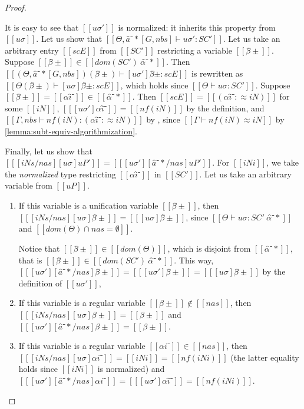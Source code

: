 \begin{proof}
\begin{caseof}
        It is easy to see that $[[uσ']]$ is normalized: it inherits this property from 
        $[[uσ]]$.
        Let us show that $[[Θ, â⁻*[G, nbs] ⊢ uσ' : SC']] $.
        Let us take an arbitrary entry $[[scE]]$ from $[[SC']]$ restricting a variable $[[β̂±]]$.
        Suppose $[[β̂±]] \in [[dom(SC') \ {α̂⁻*}]]$. Then
        $[[ (Θ, â⁻*[G, nbs])(β̂±) ⊢ [uσ']β̂± : scE ]]$ is
        rewritten as $[[ Θ(β̂±) ⊢ [uσ]β̂± : scE ]]$, which holds since $[[ Θ   ⊢ uσ : SC' ]]$.
        Suppose $[[β̂±]] = [[αî⁻]] \in [[α̂⁻*]]$. Then
        $[[scE]] = [[(αî⁻ :≈ iN)]]$ for some $[[iN]]$, 
        $[[ [uσ']αî⁻ ]] = [[ nf(iN) ]]$ by the definition,
        and $[[ Γ, nbs ⊢ nf(iN) : (αî⁻ :≈ iN) ]]$ by ,
        since $[[Γ ⊢ nf(iN) ≈ iN]]$ by \cref{lemma:subt-equiv-algorithmization}.

        Finally, let us show that $[[ [iNs/nas][uσ]uP' ]] = [[ [uσ'][â⁻*/nas]uP' ]]$.
        For $[[iNi]]$, we take the \emph{normalized} type restricting $[[αî⁻]]$ in $[[SC']]$.
        Let us take an arbitrary variable from $[[uP]]$.
        \begin{enumerate}
            \item If this variable is a unification variable $[[β̂±]]$, then
                $[[ [iNs/nas][uσ] β̂± ]] = [[ [uσ]β̂± ]] $, since $[[ Θ   ⊢ uσ : SC' \ {α̂⁻*} ]]$ and 
                $[[ dom(Θ) ∩ {nas} = ∅ ]]$. 

                Notice that $[[β̂±]] \in [[dom(Θ)]]$, which is disjoint from $[[{α̂⁻*}]]$, 
                that is $[[β̂±]] \in [[dom(SC') \ {α̂⁻*}]]$. This way,
                $[[ [uσ'][â⁻*/nas]β̂± ]] = [[  [uσ']β̂± ]] = [[ [uσ]β̂± ]]$ by the definition 
                of $[[uσ']]$,
            \item If this variable is a regular variable $[[β±]] \notin [[nas]]$, then 
                $[[ [iNs/nas][uσ] β± ]] = [[ β± ]] $ and $[[ [uσ'][â⁻*/nas]β± ]] = [[ β± ]]$. 
            \item If this variable is a regular variable $[[αi⁻]] \in [[nas]]$, then 
                $[[ [iNs/nas][uσ] αi⁻ ]] = [[ iNi ]] = [[ nf(iNi) ]]$
                (the latter equality holds since $[[iNi]]$ is normalized)
                and $[[ [uσ'][â⁻*/nas]αi⁻ ]] = [[  [uσ']αî⁻ ]] = [[ nf(iNi) ]]$.
        \end{enumerate}
    \end{caseof}
\end{proof}

